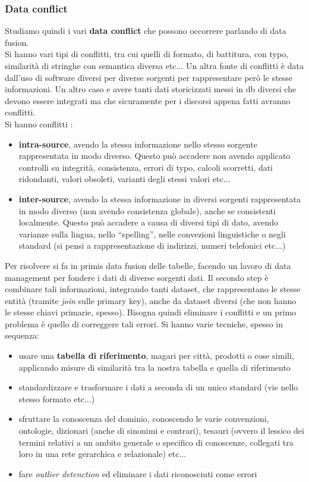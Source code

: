 \documentclass[a4paper,12pt, oneside]{book}
\begin{document}
\subsubsection{Data conflict}
Studiamo quindi i vari \textbf{data conflict} che possono occorrere parlando di
data fusion. \\
Si hanno vari tipi di conflitti, tra cui quelli di formato, di battitura, con
typo, similarità di stringhe con semantica diversa etc$\ldots$ Un altra fonte di
conflitti è data dall'uso di software 
diversi per diverse sorgenti per rappresentare però le stesse informazioni. Un
altro caso e avere tanti dati storicizzati messi in db diversi che devono essere
integrati ma che sicuramente per i discorsi appena fatti avranno conflitti.\\
Si hanno conflitti :
\begin{itemize}
  \item \textbf{intra-source}, avendo la stessa informazione nello
  stesso sorgente rappresentata in modo diverso. Questo può accadere non avendo
  applicato controlli su 
  integrità, consistenza, errori di typo, calcoli scorretti, dati ridondanti,
  valori obsoleti, varianti degli stessi valori etc$\ldots$ 
  \item \textbf{inter-source}, avendo la stessa informazione in diversi sorgenti
  rappresentata in modo diverso (non avendo consistenza globale), anche se
  consistenti localmente. Questo può accadere a causa di diversi tipi di dato,
  avendo varianze sulla lingua, nello ``spelling'', nelle convezioni
  linguistiche o negli standard (si pensi a rappresentazione di indirizzi,
  numeri telefonici etc$\ldots$) 
\end{itemize}
Per risolvere si fa in primis data fusion delle tabelle, facendo un lavoro di
data management per fondere i dati di diverse sorgenti dati. Il secondo step è
combinare tali informazioni, integrando tanti dataset, che rappresentano le
stesse entità (tramite \textit{join} sulle primary key), anche da dataset
diversi (che non hanno le stesse chiavi primarie, spesso). Bisogna quindi
eliminare i conflitti e un primo problema è quello di correggere tali errori. Si
hanno varie tecniche, spesso in sequenza:
\begin{itemize}
  \item usare una \textbf{tabella di riferimento}, magari per città, prodotti o
  cose simili, applicando misure di similarità tra la nostra tabella e quella di
  riferimento 
  \item standardizzare e trasformare i dati a seconda di un unico standard (vie
  nello stesso formato etc$\ldots$)
  \item sfruttare la conoscenza del dominio, conoscendo le varie convenzioni,
  ontologie, dizionari (anche di sinonimi e contrari), tesauri (ovvero il
  lessico dei termini relativi a un ambito generale o specifico di conoscenze,
  collegati tra loro in una rete gerarchica e relazionale) etc$\ldots$ 
  \item fare \textit{outlier detenction} ed eliminare i dati riconosciuti come
  errori 
\end{itemize}
\end{document}
